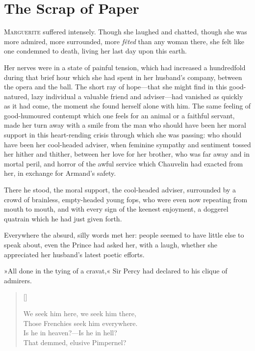 
\chapter{The Scrap of Paper}
\lettrine[lines=4]{M}{arguerite} suffered intensely. Though she laughed and chatted, though she was more admired, more surrounded, more \textit{fêted} than any woman there, she felt like one condemned to death, living her last day upon this earth.

Her nerves were in a state of painful tension, which had increased a hundredfold during that brief hour which she had spent in her husband's company, between the opera and the ball. The short ray of hope\allowbreak---\allowbreak that she might find in this good-natured, lazy individual a valuable friend and adviser\allowbreak---\allowbreak had vanished as quickly as it had come, the moment she found herself alone with him. The same feeling of good-humoured contempt which one feels for an animal or a faithful servant, made her turn away with a smile from the man who should have been her moral support in this heart-rending crisis through which she was passing: who should have been her cool-headed adviser, when feminine sympathy and sentiment tossed her hither and thither, between her love for her brother, who was far away and in mortal peril, and horror of the awful service which Chauvelin had exacted from her, in exchange for Armand's safety.

There he stood, the moral support, the cool-headed adviser, surrounded by a crowd of brainless, empty-headed young fops, who were even now repeating from mouth to mouth, and with every sign of the keenest enjoyment, a doggerel quatrain which he had just given forth.

Everywhere the absurd, silly words met her: people seemed to have little else to speak about, even the Prince had asked her, with a laugh, whether she appreciated her husband's latest poetic efforts.

»All done in the tying of a cravat,« Sir Percy had declared to his clique of admirers.

\settowidth{\versewidth}{We seek him here, we seek him there,}
\begin{verse}[\versewidth]
\begin{altverse}
We seek him here, we seek him there,\\
Those Frenchies seek him everywhere.\\
Is he in heaven?\allowbreak---\allowbreak Is he in hell?\\
That demmed, elusive Pimpernel?
\end{altverse}
\end{verse}


